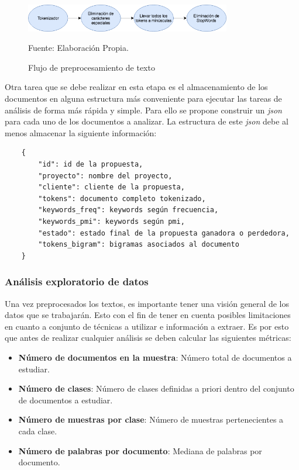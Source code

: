     \begin{figure}[H]
    \centering
    \includegraphics[width=0.8\textwidth]{figures/Normalizador_Textos.png}
    \caption{\label{fig:normalizador} Flujo de preprocesamiento de texto} Fuente: Elaboración Propia.
    \end{figure}
    
    Otra tarea que se debe realizar en esta etapa es el almacenamiento de los documentos en alguna estructura más conveniente para ejecutar las tareas de análisis de forma más rápida y simple. Para ello se propone construir un \textit{json} para cada uno de los documentos a analizar. La estructura de este \textit{json} debe al menos almacenar la siguiente información:
    
    \begin{lstlisting}
    {
        "id": id de la propuesta,
        "proyecto": nombre del proyecto,
        "cliente": cliente de la propuesta,
        "tokens": documento completo tokenizado,
        "keywords_freq": keywords según frecuencia,
        "keywords_pmi": keywords según pmi,
        "estado": estado final de la propuesta ganadora o perdedora,
        "tokens_bigram": bigramas asociados al documento
    }
    \end{lstlisting}
    

\subsubsection{Análisis exploratorio de datos}
    Una vez preprocesados los textos, es importante tener una visión general de los datos que se trabajarán. Esto con el fin de tener en cuenta posibles limitaciones en cuanto a conjunto de técnicas a utilizar e información a extraer. Es por esto que antes de realizar cualquier análisis se deben calcular las siguientes métricas:
    
    \begin{itemize}
        \item \textbf{Número de documentos en la muestra}: Número total de documentos a estudiar.
        \item \textbf{Número de clases}: Número de clases definidas a priori dentro del conjunto de documentos a estudiar.
        \item \textbf{Número de muestras por clase}: Número de muestras pertenecientes a cada clase.
        \item \textbf{Número de palabras por documento}: Mediana de palabras por documento.
    \end{itemize}
    
